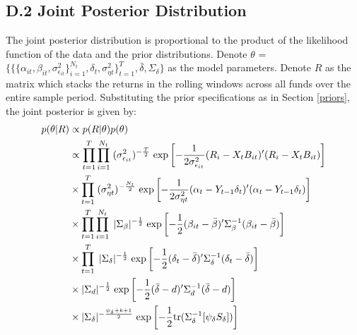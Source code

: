  \subsection*{D.2 \hspace{0.1cm} Joint Posterior Distribution}
The joint posterior distribution is proportional to the product of the likelihood function of the data and the prior distributions. Denote $\theta$ =  $\{ \{\{\alpha_{it}, \beta_{it}, \sigma^2_{\epsilon_{it}}\}^{N_t}_{i=1}, \delta_{t}, \sigma^{2}_{\eta t}\}^{T}_{t=1}, \bar{\delta}, \Sigma_{\delta}\}$ as the model parameters. Denote $R$ as the matrix which stacks the returns in the rolling windows across all funds over the entire sample period. Substituting the prior specifications as in Section \ref{priors}, the joint posterior is given by: 
\begin{alignat}{2}
\label{joint}
p(\theta|R) &\propto p(R|\theta)p(\theta) \nonumber \\  
 &\propto \prod^T_{t=1} \prod^{N_t}_{i=1} \hspace{0.1cm} (\sigma^2_{\epsilon_{it}})^{-\frac{\mathcal{T}}{2}} \hspace{0.1cm} \text{exp}\left[-\frac{1}{2\sigma^2_{\epsilon_{it}}}(R_i- X_tB_{it})' (R_i- X_tB_{it})\right]  \nonumber \\  
      &\times \prod^{T}_{t=1} \hspace{0.1cm} (\sigma^2_{\eta t})^{-\frac{N_t}{2}}\hspace{0.1cm} \text{exp}\left[-\frac{1}{2\sigma^2_{\eta t}}(\alpha_t- Y_{t-1}\delta_{t})'(\alpha_t- Y_{t-1}\delta_{t})\right]  \nonumber \\  
      &\times \prod^{T}_{t=1} \prod^{N_t}_{i=1} \hspace{0.1cm}|\Sigma_{\beta}|^{-\frac{1}{2}}\hspace{0.1cm}\text{exp}\left[-\frac{1}{2}(\beta_{it}-\bar{\beta})'\Sigma^{-1}_{\beta}(\beta_{it}-\bar{\beta})\right]   \nonumber \\  
  &\times \prod^{T}_{t=1} \hspace{0.1cm} |\Sigma_{\delta}|^{-\frac{1}{2}} \hspace{0.1cm} \text{exp}\left[-\frac{1}{2}(\delta_{t}-\bar{\delta})'\Sigma^{-1}_{\delta} (\delta_{t}-\bar{\delta})\right] \nonumber \\  
  &\times |\Sigma_d|^{-\frac{1}{2}} \hspace{0.1cm} \text{exp}\left[-\frac{1}{2}(\bar{\delta} - d)'\Sigma^{-1}_d (\bar{\delta} - d) \right]  \nonumber \\  
  &\times |\Sigma_{\delta}|^{-\frac{\psi_\delta + k + 1}{2}} \hspace{0.1cm} \text{exp}\left[-\frac{1}{2} \text{tr}(\Sigma^{-1}_{\delta} [\psi_\delta S_\delta])\right] \nonumber \\  

\end{alignat}
